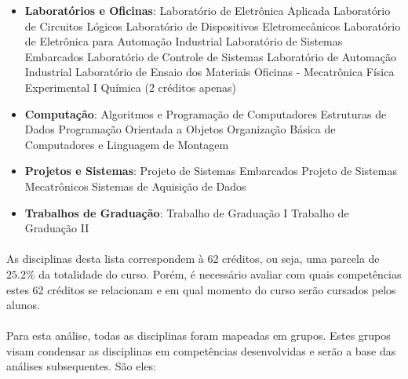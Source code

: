 \documentclass[12pt]{article} %
\begin{document}
\begin{itemize}
\setlength\itemsep{0.01mm}
\item\textbf{Laboratórios e Oficinas}: 
	\subitem Laboratório de Eletrônica Aplicada 
	\subitem Laboratório de Circuitos Lógicos 
	\subitem Laboratório de Dispositivos Eletromecânicos 
	\subitem Laboratório de Eletrônica para Automação Industrial 
	\subitem Laboratório de Sistemas Embarcados
	\subitem Laboratório de Controle de Sistemas
	\subitem Laboratório de Automação Industrial
	\subitem Laboratório de Ensaio dos Materiais
	\subitem Oficinas - Mecatrônica
	\subitem Física Experimental I
	\subitem Química (2 créditos apenas)
\item\textbf{Computação}:
	\subitem Algoritmos e Programação de Computadores
	\subitem Estruturas de Dados
	\subitem Programação Orientada a Objetos
	\subitem Organização Básica de Computadores e Linguagem de Montagem
\item\textbf{Projetos e Sistemas}:
	\subitem Projeto de Sistemas Embarcados
	\subitem Projeto de Sistemas Mecatrônicos
	\subitem Sistemas de Aquisição de Dados
\item \textbf{Trabalhos de Graduação}:
	\subitem Trabalho de Graduação I 
	\subitem Trabalho de Graduação II
\end{itemize}

\paragraph{} As disciplinas desta lista correspondem à 62 créditos, ou seja, uma parcela de $25.2\%$ da totalidade do curso. Porém, é necessário avaliar com quais competências estes 62 créditos se relacionam e em qual momento do curso serão cursados pelos alunos.

\paragraph{} Para esta análise, todas as disciplinas foram mapeadas em grupos. Estes grupos visam condensar as disciplinas em competências desenvolvidas e serão a base das análises subsequentes. São eles:
\end{document}
